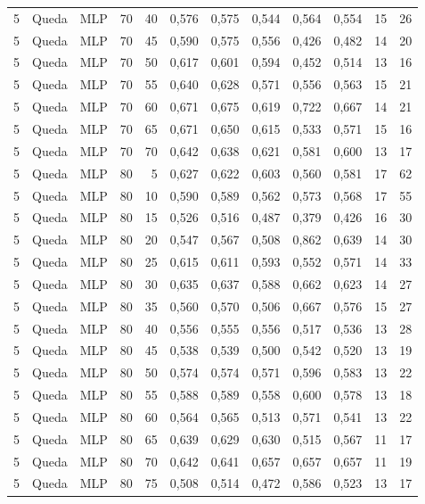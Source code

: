 \begin{longtable}{@{}rllrrrrrrrrr@{}}
5 & Queda & MLP & 70 & 40 & 0,576 & 0,575 & 0,544 & 0,564 & 0,554 & 15 & 26 \\
5 & Queda & MLP & 70 & 45 & 0,590 & 0,575 & 0,556 & 0,426 & 0,482 & 14 & 20 \\
5 & Queda & MLP & 70 & 50 & 0,617 & 0,601 & 0,594 & 0,452 & 0,514 & 13 & 16 \\
5 & Queda & MLP & 70 & 55 & 0,640 & 0,628 & 0,571 & 0,556 & 0,563 & 15 & 21 \\
5 & Queda & MLP & 70 & 60 & 0,671 & 0,675 & 0,619 & 0,722 & 0,667 & 14 & 21 \\
5 & Queda & MLP & 70 & 65 & 0,671 & 0,650 & 0,615 & 0,533 & 0,571 & 15 & 16 \\
5 & Queda & MLP & 70 & 70 & 0,642 & 0,638 & 0,621 & 0,581 & 0,600 & 13 & 17 \\
5 & Queda & MLP & 80 & 5 & 0,627 & 0,622 & 0,603 & 0,560 & 0,581 & 17 & 62 \\
5 & Queda & MLP & 80 & 10 & 0,590 & 0,589 & 0,562 & 0,573 & 0,568 & 17 & 55 \\
5 & Queda & MLP & 80 & 15 & 0,526 & 0,516 & 0,487 & 0,379 & 0,426 & 16 & 30 \\
5 & Queda & MLP & 80 & 20 & 0,547 & 0,567 & 0,508 & 0,862 & 0,639 & 14 & 30 \\
5 & Queda & MLP & 80 & 25 & 0,615 & 0,611 & 0,593 & 0,552 & 0,571 & 14 & 33 \\
5 & Queda & MLP & 80 & 30 & 0,635 & 0,637 & 0,588 & 0,662 & 0,623 & 14 & 27 \\
5 & Queda & MLP & 80 & 35 & 0,560 & 0,570 & 0,506 & 0,667 & 0,576 & 15 & 27 \\
5 & Queda & MLP & 80 & 40 & 0,556 & 0,555 & 0,556 & 0,517 & 0,536 & 13 & 28 \\
5 & Queda & MLP & 80 & 45 & 0,538 & 0,539 & 0,500 & 0,542 & 0,520 & 13 & 19 \\
5 & Queda & MLP & 80 & 50 & 0,574 & 0,574 & 0,571 & 0,596 & 0,583 & 13 & 22 \\
5 & Queda & MLP & 80 & 55 & 0,588 & 0,589 & 0,558 & 0,600 & 0,578 & 13 & 18 \\
5 & Queda & MLP & 80 & 60 & 0,564 & 0,565 & 0,513 & 0,571 & 0,541 & 13 & 22 \\
5 & Queda & MLP & 80 & 65 & 0,639 & 0,629 & 0,630 & 0,515 & 0,567 & 11 & 17 \\
5 & Queda & MLP & 80 & 70 & 0,642 & 0,641 & 0,657 & 0,657 & 0,657 & 11 & 19 \\
5 & Queda & MLP & 80 & 75 & 0,508 & 0,514 & 0,472 & 0,586 & 0,523 & 13 & 17 \\

\end{longtable}
